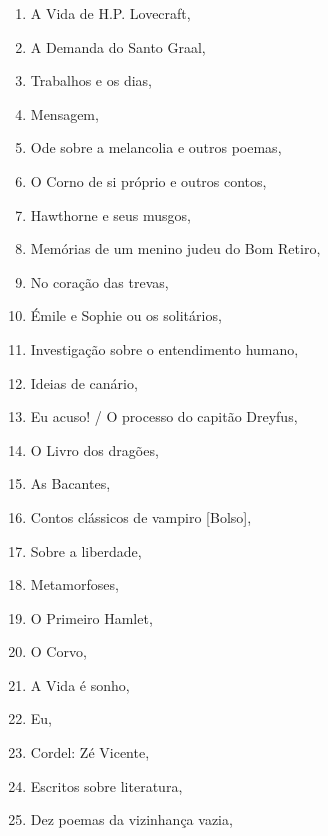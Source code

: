 \begin{multicols}{2}
\begin{enumerate}
\item A Vida de H.P. Lovecraft, {}
\item A Demanda do Santo Graal, {}
\item Trabalhos e os dias, {}
\item Mensagem, {}
\item Ode sobre a melancolia e outros poemas, {}
\item O Corno de si próprio e outros contos, {}
\item Hawthorne e seus musgos, {}
\item Memórias de um menino judeu do Bom Retiro, {}
\item No coração das trevas, {}
\item Émile e Sophie ou os solitários, {}
\item Investigação sobre o entendimento humano, {}
\item Ideias de canário, {}
\item Eu acuso! / O processo do capitão Dreyfus, {}
\item O Livro dos dragões, {}
\item As Bacantes, {}
\item Contos clássicos de vampiro [Bolso], {}
\item Sobre a liberdade, {}
\item Metamorfoses, {}
\item O Primeiro Hamlet, {}
\item O Corvo, {}
\item A Vida é sonho, {}
\item Eu, {}
\item Cordel: Zé Vicente, {}
\item Escritos sobre literatura, {}
\item Dez poemas da vizinhança vazia, {}

\end{enumerate}
\end{multicols}
